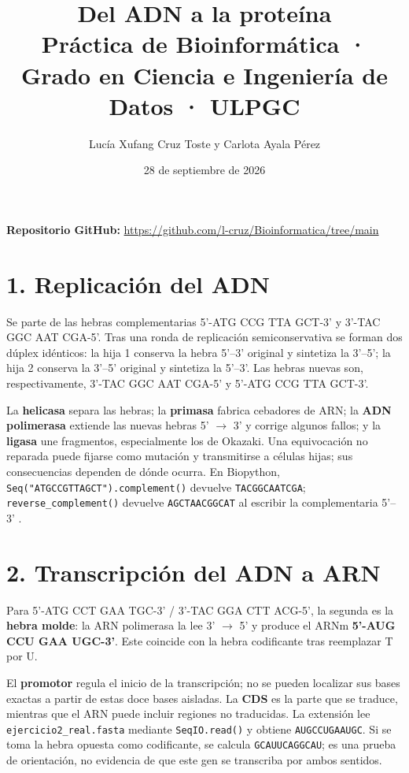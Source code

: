 \documentclass[10pt,a4paper]{article}
\title{\vspace{-1.4cm}\textbf{Del ADN a la proteína}\\\normalsize Práctica de Bioinformática · Grado en Ciencia e Ingeniería de Datos · ULPGC}
\author{Lucía Xufang Cruz Toste y Carlota Ayala Pérez}
\date{28 de septiembre de 2026}
\begin{document}
\maketitle
\vspace{-1cm}
\begin{center}
\textbf{Repositorio GitHub:} \url{https://github.com/l-cruz/Bioinformatica/tree/main}
\end{center}

\section*{1. Replicación del ADN}
Se parte de las hebras complementarias 5'-ATG CCG TTA GCT-3' y 3'-TAC GGC AAT CGA-5'. Tras una ronda de replicación semiconservativa se forman dos dúplex idénticos: la hija 1 conserva la hebra 5'--3' original y sintetiza la 3'--5'; la hija 2 conserva la 3'--5' original y sintetiza la 5'--3'. Las hebras nuevas son, respectivamente, 3'-TAC GGC AAT CGA-5' y 5'-ATG CCG TTA GCT-3'.

La \textbf{helicasa} separa las hebras; la \textbf{primasa} fabrica cebadores de ARN; la \textbf{ADN polimerasa} extiende las nuevas hebras 5' $\rightarrow$ 3' y corrige algunos fallos; y la \textbf{ligasa} une fragmentos, especialmente los de Okazaki. Una equivocación no reparada puede fijarse como mutación y transmitirse a células hijas; sus consecuencias dependen de dónde ocurra. En Biopython, \texttt{Seq("ATGCCGTTAGCT").complement()} devuelve \texttt{TACGGCAATCGA}; \texttt{reverse\_complement()} devuelve \texttt{AGCTAACGGCAT} al escribir la complementaria 5'--3' \cite{alberts}.

\section*{2. Transcripción del ADN a ARN}
Para 5'-ATG CCT GAA TGC-3' / 3'-TAC GGA CTT ACG-5', la segunda es la \textbf{hebra molde}: la ARN polimerasa la lee 3' $\rightarrow$ 5' y produce el ARNm \textbf{5'-AUG CCU GAA UGC-3'}. Este coincide con la hebra codificante tras reemplazar T por U.

El \textbf{promotor} regula el inicio de la transcripción; no se pueden localizar sus bases exactas a partir de estas doce bases aisladas. La \textbf{CDS} es la parte que se traduce, mientras que el ARN puede incluir regiones no traducidas. La extensión lee \texttt{ejercicio2\_real.fasta} mediante \texttt{SeqIO.read()} y obtiene \texttt{AUGCCUGAAUGC}. Si se toma la hebra opuesta como codificante, se calcula \texttt{GCAUUCAGGCAU}; es una prueba de orientación, no evidencia de que este gen se transcriba por ambos sentidos.
\end{document}
